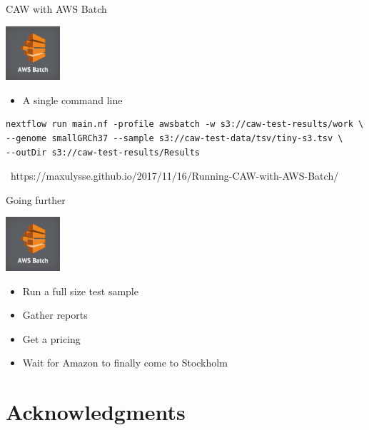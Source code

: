 \documentclass{beamer}
\begin{document}
\begin{frame}[fragile]{CAW with AWS Batch}
	\begin{center}
		\includegraphics[height=2cm]{pictures/Batch.png}
	\end{center}
	\pause
	\begin{itemize}
		\item A single command line
	\end{itemize}
	\begin{verbatim}
nextflow run main.nf -profile awsbatch -w s3://caw-test-results/work \
--genome smallGRCh37 --sample s3://caw-test-data/tsv/tiny-s3.tsv \
--outDir s3://caw-test-results/Results
	\end{verbatim}
	\pause
	\footnotesize
	\faGlobe\ https://maxulysse.github.io/2017/11/16/Running-CAW-with-AWS-Batch/
\end{frame}

\begin{frame}{Going further}
	\begin{center}
		\includegraphics[height=2cm]{pictures/Batch.png}
	\end{center}
	\begin{itemize}
		\item Run a full size test sample
		\pause
		\item Gather reports
		\pause
		\item Get a pricing
		\pause
		\item Wait for Amazon to finally come to Stockholm
	\end{itemize}
\end{frame}

\section{Acknowledgments}
\end{document}
